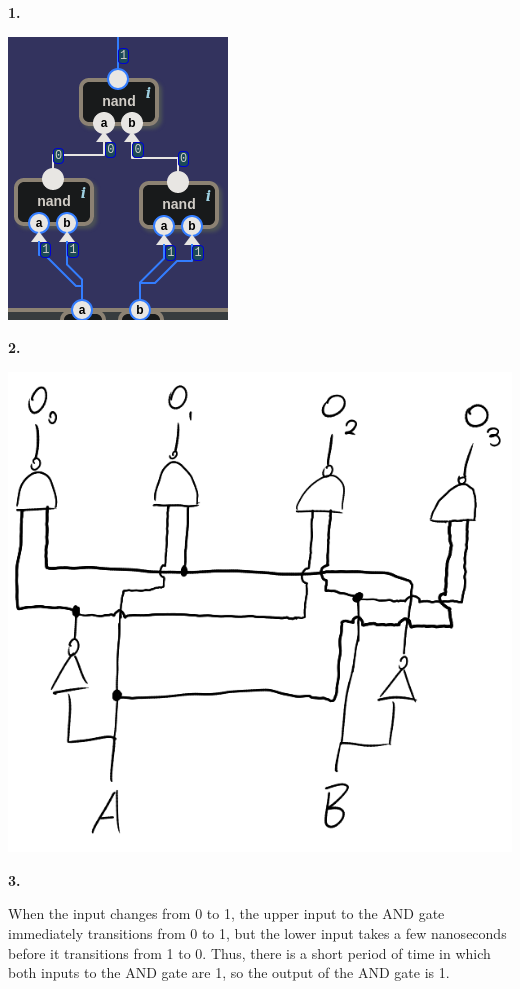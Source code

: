 \documentclass{article}
\begin{document}
\medskip\noindent\textbf{1.} \begin{center}\includegraphics{or_gate.png}\end{center}    

\medskip\noindent\textbf{2.} \begin{center}\includegraphics[scale=.5]{2-4-line.png}\end{center}

\medskip\noindent\textbf{3.}

    When the input changes from 0 to 1, the upper input to the AND gate immediately transitions from 0 to 1, but the lower input takes a few nanoseconds before it transitions from 1 to 0. Thus, there is a short period of time in which both inputs to the AND gate are 1, so the output of the AND gate is 1.
\end{document}
